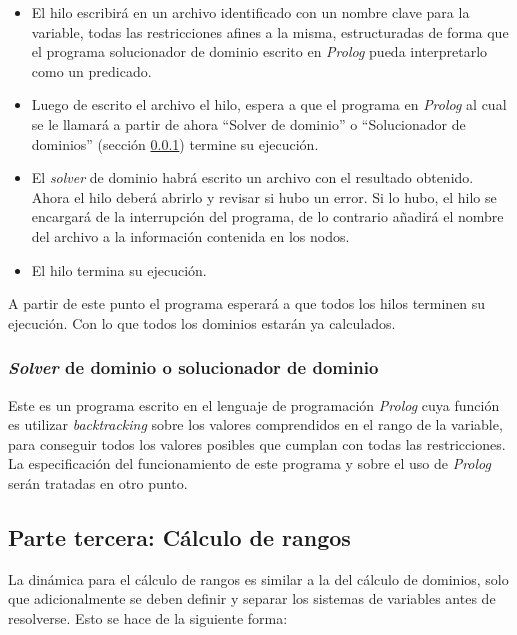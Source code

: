 \begin{itemize}
 \item {El hilo escribirá en un archivo identificado con un nombre clave para la 
  variable, todas las restricciones afines a la misma, estructuradas de forma que 
  el programa solucionador de dominio escrito en \emph{Prolog} pueda interpretarlo como un 
  predicado.}
 \item {Luego de escrito el archivo el hilo, espera a que el programa en \emph{Prolog} 
  al cual se le llamará a partir de ahora ``Solver de dominio'' o ``Solucionador de 
  dominios'' (sección \ref{solver_dom}) termine su ejecución.}
 \item {El \emph{solver} de dominio habrá escrito un archivo con el resultado obtenido.
  Ahora el hilo deberá abrirlo y revisar si hubo un error. Si lo hubo, el hilo se 
  encargará de la interrupción del programa, de lo contrario añadirá el nombre 
  del archivo a la información contenida en los nodos.}
 \item {El hilo termina su ejecución.}
\end{itemize}

A partir de este punto el programa esperará a que todos los hilos terminen su 
ejecución. Con lo que todos los dominios estarán ya calculados.

\subsubsection{\textit{Solver} de dominio o solucionador de dominio}
\label{solver_dom}
Este es un programa escrito en el lenguaje de programación \emph{Prolog} cuya función es 
utilizar \emph{backtracking} sobre los valores comprendidos en el rango de la variable, 
para conseguir todos los valores posibles que cumplan con todas las restricciones. 
La especificación del funcionamiento de este programa y sobre el uso de \emph{Prolog} 
serán tratadas en otro punto.

\subsection{Parte tercera: Cálculo de rangos}\label{solver:cal_rangos}
La dinámica para el cálculo de rangos es similar a la del cálculo de dominios, 
solo que adicionalmente se deben definir y separar los sistemas de variables 
antes de resolverse. Esto se hace de la siguiente forma:

